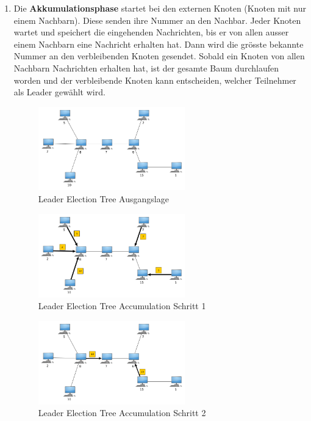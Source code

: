 \begin{enumerate}
	\item Die \textbf{Akkumulationsphase} startet bei den externen Knoten (Knoten mit nur einem Nachbarn). Diese senden ihre Nummer an den Nachbar. Jeder Knoten wartet und speichert die eingehenden Nachrichten, bis er von allen ausser einem Nachbarn eine Nachricht erhalten hat. Dann wird die grösste bekannte Nummer an den verbleibenden Knoten gesendet. Sobald ein Knoten von allen Nachbarn Nachrichten erhalten hat, ist der gesamte Baum durchlaufen worden und der verbleibende Knoten kann entscheiden, welcher Teilnehmer als Leader gewählt wird.
    
\begin{figure}[H]
	\centering
		\includegraphics[width=0.6\textwidth]{bilder/leaderElectionTree_1.png}
	\caption{\label{fig:treeLeader_1}Leader Election Tree Ausgangslage}
\end{figure}

\begin{figure}[H]
	\centering
		\includegraphics[width=0.6\textwidth]{bilder/leaderElectionTree_2.png}
	\caption{\label{fig:treeLeader_2}Leader Election Tree Accumulation Schritt 1}
\end{figure}

\begin{figure}[H]
	\centering
		\includegraphics[width=0.6\textwidth]{bilder/leaderElectionTree_3.png}
	\caption{\label{fig:treeLeader_3}Leader Election Tree Accumulation Schritt 2}
\end{figure}


\end{enumerate}
